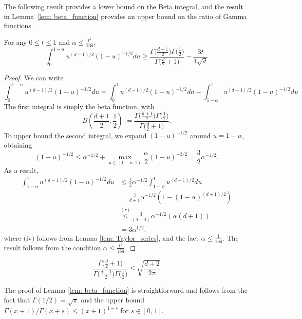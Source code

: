 \documentclass[11pt,twoside]{article}
\newcommand{\1}{\mathbbm{1}}
\begin{document}
The following result provides a lower bound on the Beta integral, and the result in Lemma~\ref{lem: beta_function} provides
an upper bound on the ratio of Gamma functions. 
\begin{lemma}
	\label{lem: beta_integral}
	For any $0 \leq t \leq 1$ and $\alpha \leq \frac{t^2}{16 d}$,
	\begin{equation*}
	\int_{0}^{1 - \alpha}u^{(d-1)/2}(1 - u)^{-1/2}du \geq \frac{\Gamma\bigl(\frac{d + 1}{2}\bigr)\Gamma\bigl(\frac{1}{2}\bigr)}{ \Gamma\bigl(\frac{d}{2}+ 1\bigr)} - \frac{3t}{4\sqrt{d}}
	\end{equation*}
\end{lemma}
\begin{proof}
	We can write 
	\begin{equation*}
	\int_{0}^{1 - \alpha}u^{(d-1)/2}(1 - u)^{-1/2}du = \int_{0}^{1}u^{(d-1)/2}(1 - u)^{-1/2}du - \int_{1 - \alpha}^{1}u^{(d-1)/2}(1 - u)^{-1/2}du
	\end{equation*}
	The first integral is simply the beta function, with
	\begin{equation*}
	B(\frac{d+1}{2},\frac{1}{2}) := \frac{\Gamma\bigl(\frac{d + 1}{2}\bigr)\Gamma\bigl(\frac{1}{2}\bigr)}{ \Gamma\bigl(\frac{d}{2}+ 1\bigr)}.
	\end{equation*}
	To upper bound the second integral, we expand $(1 - u)^{-1/2}$ around $u = 1 - \alpha$, obtaining
	\begin{equation*}
	(1 - u)^{-1/2} \leq \alpha^{-1/2} + \max_{u \in (1 - \alpha, 1)} \frac{\alpha}{2} (1 - u)^{-3/2} = \frac{3}{2}\alpha^{-1/2}.
	\end{equation*}
	As a result,
	\begin{align*}
	\int_{1 - \alpha}^{1}u^{(d-1)/2}(1 - u)^{-1/2}du & \leq \frac{3}{2}\alpha^{-1/2} \int_{1 - \alpha}^{1}u^{(d-1)/2}du \\
	& = \frac{3}{d+1}\alpha^{-1/2} \left(1 - (1 - \alpha)^{(d + 1)/2}\right) \\
	& \overset{\text{(iv)}}{\leq} \frac{3}{(d+1)}\alpha^{-1/2} (\alpha(d + 1)) \\
	& =  3\alpha^{1/2}.
	\end{align*}
	where $\text{(iv)}$ follows from Lemma \ref{lem: Taylor_series}, and the fact $\alpha \leq \frac{1}{16d}$. The result follows from the condition $\alpha \leq \frac{t^2}{16d}$. 
\end{proof}

\begin{lemma}
	\label{lem: beta_function}
	\begin{equation*}
	\frac{\Gamma\bigl(\frac{d}{2}+ 1\bigr)}{\Gamma\bigl(\frac{d + 1}{2}\bigr) \Gamma\bigl(\frac{1}{2}\bigr)} \leq \sqrt{\frac{d + 2}{2\pi}}
	\end{equation*}
\end{lemma}
\noindent The proof of Lemma \ref{lem: beta_function} is straightforward and follows from the fact that $\Gamma(1/2) = \sqrt{\pi}$ and the upper bound $\Gamma(x + 1)/ \Gamma(x+s) \leq (x + 1)^{1-s}$ for $s \in [0,1]$.
\end{document}
